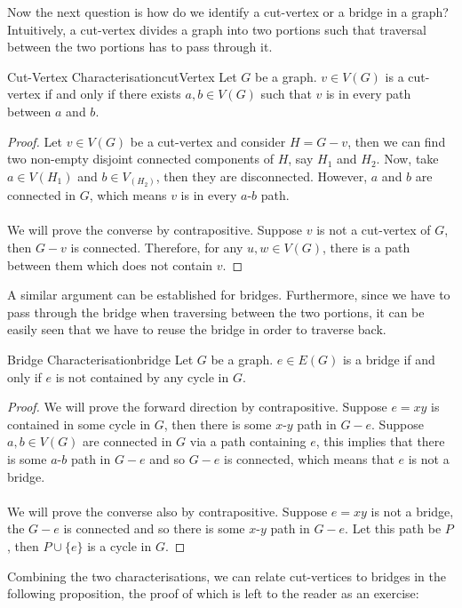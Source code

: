 \documentclass[math, code]{amznotes}
\theoremstyle{remark}
\begin{document}
Now the next question is how do we identify a cut-vertex or a bridge in a graph? Intuitively, a cut-vertex divides a graph into two portions such that traversal between the two portions has to pass through it.
\begin{thmbox}{Cut-Vertex Characterisation}{cutVertex}
    Let $G$ be a graph. $v \in V(G)$ is a cut-vertex if and only if there exists $a, b \in V(G)$ such that $v$ is in every path between $a$ and $b$.
    \tcblower
    \begin{proof}
        Let $v \in V(G)$ be a cut-vertex and consider $H = G - v$, then we can find two non-empty disjoint connected components of $H$, say $H_1$ and $H_2$. Now, take $a \in V(H_1)$ and $b \in V_(H_2)$, then they are disconnected. However, $a$ and $b$ are connected in $G$, which means $v$ is in every $a$-$b$ path.
        \\\\
        We will prove the converse by contrapositive. Suppose $v$ is not a cut-vertex of $G$, then $G - v$ is connected. Therefore, for any $u, w \in V(G)$, there is a path between them which does not contain $v$.
    \end{proof}
\end{thmbox}
A similar argument can be established for bridges. Furthermore, since we have to pass through the bridge when traversing between the two portions, it can be easily seen that we have to reuse the bridge in order to traverse back.
\begin{thmbox}{Bridge Characterisation}{bridge}
    Let $G$ be a graph. $e \in E(G)$ is a bridge if and only if $e$ is not contained by any cycle in $G$.
    \tcblower
    \begin{proof}
        We will prove the forward direction by contrapositive. Suppose $e = xy$ is contained in some cycle in $G$, then there is some $x$-$y$ path in $G - e$. Suppose $a, b \in V(G)$ are connected in $G$ via a path containing $e$, this implies that there is some $a$-$b$ path in $G - e$ and so $G - e$ is connected, which means that $e$ is not a bridge.
        \\\\
        We will prove the converse also by contrapositive. Suppose $e = xy$ is not a bridge, the $G - e$ is connected and so there is some $x$-$y$ path in $G - e$. Let this path be $P$, then $P \cup \{e\}$ is a cycle in $G$.
    \end{proof}
\end{thmbox}
Combining the two characterisations, we can relate cut-vertices to bridges in the following proposition, the proof of which is left to the reader as an exercise:
\end{document}
